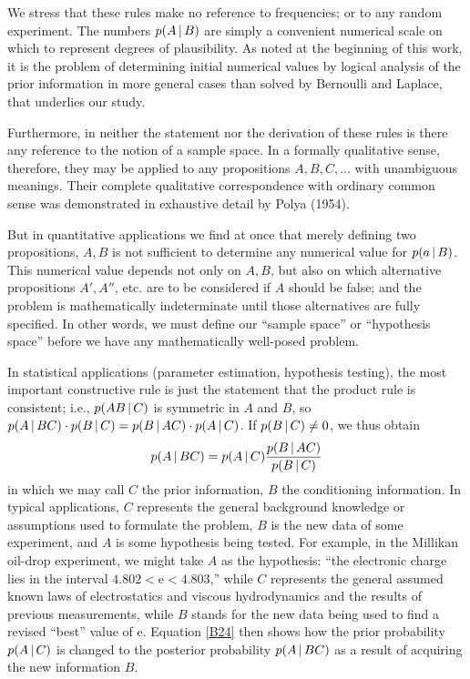 We stress that these rules make no reference to frequencies; or to any random experiment.
The numbers $p(A\,\vert\, B)$ are simply a convenient numerical scale on which to represent degrees of plausibility.
As noted at the beginning of this work, it is the problem of determining initial numerical values by logical analysis of the prior information in more general cases than solved by Bernoulli and Laplace, that underlies our study.

Furthermore, in neither the statement nor the derivation of these rules is there any reference to the notion of a sample space.
In a formally qualitative sense, therefore, they may be applied to any propositions $A,B, C,\ldots$ with unambiguous meanings.
Their complete qualitative correspondence with ordinary common sense was demonstrated in exhaustive detail by Polya (\cite{polya}{1954}).

But in quantitative applications we find at once that merely defining two propositions, $A, B$ is not sufficient to determine any numerical value for $p(a\,\vert\, B)$.
This numerical value depends not only on $A, B$, but also on which alternative propositions $A', A''$, etc. are to be considered if $A$ should be false; and the problem is mathematically indeterminate until those alternatives are fully specified.
In other words, we must define our ``sample space'' or ``hypothesis space'' before we have any mathematically well-posed problem.

In statistical applications (parameter estimation, hypothesis testing), the most important constructive rule is just the statement that the product rule is consistent; i.e., $p(AB\,\vert\, C)$ is symmetric in $A$ and $B$, so $p(A \,\vert\, BC)\cdot p(B \,\vert\, C) = p(B\,\vert\, AC)\cdot p(A\,\vert\, C)$.
If $p(B\,\vert\, C) \neq 0$, we thus obtain
\begin{equation}
	\label{B24}
	p(A \,\vert\, BC) = p(A\,\vert\, C) \frac{p(B\,\vert\, AC)}{p(B\,\vert\, C)}
\end{equation}
in which we may call $C$ the prior information, $B$ the conditioning information.
In typical applications, $C$ represents the general background knowledge or assumptions used to formulate the problem, $B$ is the new data of some experiment, and $A$ is some hypothesis being tested.
For example, in the Millikan oil-drop experiment, we might take $A$ as the hypothesis: ``the electronic charge lies in the interval $4.802 < \mathrm{e} < 4.803$,'' while $C$ represents the general assumed known laws of electrostatics and viscous hydrodynamics and the results of previous measurements, while $B$ stands for the new data being used to find a revised ``best'' value of $\mathrm{e}$.
Equation \eqref{B24} then shows how the prior probability $p(A\,\vert\, C)$ is changed to the posterior probability $p(A\,\vert\, BC)$ as a result of acquiring the new information $B$.

